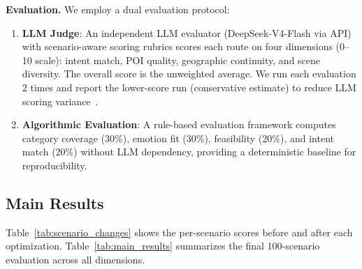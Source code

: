 \textbf{Evaluation.} We employ a dual evaluation protocol:
\begin{enumerate}[leftmargin=*]
    \item \textbf{LLM Judge}: An independent LLM evaluator (DeepSeek-V4-Flash via API) with scenario-aware scoring rubrics scores each route on four dimensions (0--10 scale): intent match, POI quality, geographic continuity, and scene diversity. The overall score is the unweighted average. We run each evaluation 2 times and report the lower-score run (conservative estimate) to reduce LLM scoring variance~\cite{gu2024llmjudge}.
    \item \textbf{Algorithmic Evaluation}: A rule-based evaluation framework computes category coverage (30\%), emotion fit (30\%), feasibility (20\%), and intent match (20\%) without LLM dependency, providing a deterministic baseline for reproducibility.
\end{enumerate}

\subsection{Main Results}

Table~\ref{tab:scenario_changes} shows the per-scenario scores before and after each optimization. Table~\ref{tab:main_results} summarizes the final 100-scenario evaluation across all dimensions.

\begin{table}[!t]
\centering
\caption{Per-scenario evaluation scores (0--10) for CityFlow on 5 core scenarios. Scores from LLM judge (Qwen3.5-35B-A3B). Test run: 2026-06-02.}
\label{tab:main_results}
\end{table}

